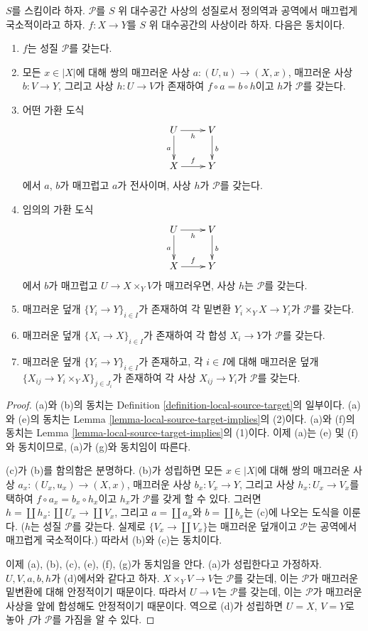 \begin{lemma}
\label{lemma-local-source-target-characterize}
$S$를 스킴이라 하자. $\mathcal{P}$를 $S$ 위 대수공간 사상의 성질로서
정의역과 공역에서 매끄럽게 국소적이라고 하자. $f:X\to Y$를 $S$ 위
대수공간의 사상이라 하자. 다음은 동치이다.
\begin{enumerate}
\item[(a)] $f$는 성질 $\mathcal{P}$를 갖는다.
\item[(b)] 모든 $x\in|X|$에 대해 쌍의 매끄러운 사상
$a:(U,u)\to(X,x)$, 매끄러운 사상 $b:V\to Y$, 그리고 사상
$h:U\to V$가 존재하여 $f\circ a=b\circ h$이고 $h$가 $\mathcal{P}$를
갖는다.
\item[(c)] 어떤 가환 도식
$$
\xymatrix{
U \ar[d]_a \ar[r]_h & V \ar[d]^b \\
X \ar[r]^f & Y
}
$$
에서 $a$, $b$가 매끄럽고 $a$가 전사이며, 사상 $h$가 $\mathcal{P}$를
갖는다.
\item[(d)] 임의의 가환 도식
$$
\xymatrix{
U \ar[d]_a \ar[r]_h & V \ar[d]^b \\
X \ar[r]^f & Y
}
$$
에서 $b$가 매끄럽고 $U\to X\times_YV$가 매끄러우면, 사상 $h$는
$\mathcal{P}$를 갖는다.
\item[(e)] 매끄러운 덮개 $\{Y_i\to Y\}_{i\in I}$가 존재하여 각 밑변환
$Y_i\times_YX\to Y_i$가 $\mathcal{P}$를 갖는다.
\item[(f)] 매끄러운 덮개 $\{X_i\to X\}_{i\in I}$가 존재하여 각 합성
$X_i\to Y$가 $\mathcal{P}$를 갖는다.
\item[(g)] 매끄러운 덮개 $\{Y_i\to Y\}_{i\in I}$가 존재하고, 각
$i\in I$에 대해 매끄러운 덮개
$\{X_{ij}\to Y_i\times_YX\}_{j\in J_i}$가 존재하여 각 사상
$X_{ij}\to Y_i$가 $\mathcal{P}$를 갖는다.
\end{enumerate}
\end{lemma}

\begin{proof}
(a)와 (b)의 동치는 Definition \ref{definition-local-source-target}의
일부이다. (a)와 (e)의 동치는 Lemma
\ref{lemma-local-source-target-implies}의 (2)이다. (a)와 (f)의 동치는
Lemma \ref{lemma-local-source-target-implies}의 (1)이다. 이제 (a)는
(e) 및 (f)와 동치이므로,
(a)가 (g)와 동치임이 따른다.

\medskip\noindent
(c)가 (b)를 함의함은 분명하다. (b)가 성립하면 모든 $x\in|X|$에 대해
쌍의 매끄러운 사상 $a_x:(U_x,u_x)\to(X,x)$, 매끄러운 사상
$b_x:V_x\to Y$, 그리고 사상 $h_x:U_x\to V_x$를 택하여
$f\circ a_x=b_x\circ h_x$이고 $h_x$가 $\mathcal{P}$를 갖게 할 수 있다.
그러면 $h=\coprod h_x:\coprod U_x\to\coprod V_x$, 그리고
$a=\coprod a_x$와 $b=\coprod b_x$는 (c)에 나오는 도식을 이룬다.
($h$는 성질 $\mathcal{P}$를 갖는다. 실제로
$\{V_x\to\coprod V_x\}$는 매끄러운 덮개이고 $\mathcal{P}$는 공역에서
매끄럽게 국소적이다.) 따라서 (b)와
(c)는 동치이다.

\medskip\noindent
이제 (a), (b), (c), (e), (f), (g)가 동치임을 안다. (a)가 성립한다고
가정하자. $U,V,a,b,h$가 (d)에서와 같다고 하자. $X\times_YV\to V$는
$\mathcal{P}$를 갖는데, 이는 $\mathcal{P}$가 매끄러운 밑변환에 대해
안정적이기 때문이다. 따라서 $U\to V$는 $\mathcal{P}$를 갖는데, 이는
$\mathcal{P}$가 매끄러운 사상을 앞에 합성해도 안정적이기 때문이다. 역으로 (d)가
성립하면 $U=X$, $V=Y$로 놓아 $f$가 $\mathcal{P}$를 가짐을 알 수 있다.
\end{proof}

